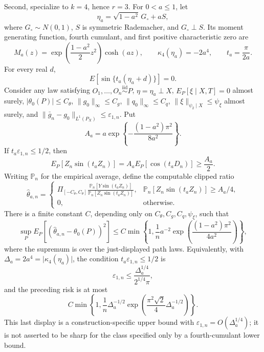 Second, specialize to \(k=4\), hence \(r=3\).  For \(0<a\le1\), let
\[
 \eta_a=\sqrt{1-a^2}\,G_{\circ}+aS,
\]
where \(G_{\circ}\sim N(0,1)\), \(S\) is symmetric Rademacher, and \(G_{\circ}\perp S\).  Its moment generating function, fourth cumulant, and first positive characteristic zero are
\[
 M_a(z)=\exp\!\left(\frac{1-a^2}{2}z^2\right)\cosh(az),
 \qquad
 \kappa_4(\eta_a)=-2a^4,
 \qquad
 t_a=\frac{\pi}{2a}.
\]
For every real \(d\),
\[
 E\!\left[\sin\{t_a(\eta_a+d)\}\right]=0.
\]
Consider any law satisfying \(O_1,\ldots,O_n\stackrel{\mathrm{iid}}{\sim}P\), \(\eta=\eta_a\perp X\), \(E_P[\xi\mid X,T]=0\) almost surely, \(\lvert\theta_0(P)\rvert\le C_{\theta}\), \(\lVert g_0\rVert_{\infty}\le C_g\), \(\lVert q_0\rVert_{\infty}\le C_q\), \(\lVert\xi\rVert_{\psi_2\mid X}\le\psi_{\xi}\) almost surely, and \(\lVert\bar g_n-g_0\rVert_{L^1(P_X)}\le\varepsilon_{1,n}\).  Put
\[
 A_a=a\exp\!\left\{-\frac{(1-a^2)\pi^2}{8a^2}\right\}.
\]
If \(t_a\varepsilon_{1,n}\le1/2\), then
\[
 E_P\!\left[Z_n\sin(t_aZ_n)\right]
 =A_aE_P[\cos(t_aD_n)]
 \ge\frac{A_a}{2}.
\]
Writing \(\mathbb P_n\) for the empirical average, define the computable clipped ratio
\[
 \widehat\theta_{a,n}
 =
 \begin{cases}
 \displaystyle
 \Pi_{[-C_{\theta},C_{\theta}]}
 \frac{\mathbb P_n[Y\sin(t_aZ_n)]}
      {\mathbb P_n[Z_n\sin(t_aZ_n)]},
 &\displaystyle
 \mathbb P_n[Z_n\sin(t_aZ_n)]\ge A_a/4,\\[3mm]
 0,&\text{otherwise}.
 \end{cases}
\]
There is a finite constant \(C\), depending only on \(C_{\theta},C_g,C_q,\psi_{\xi}\), such that
\[
 \sup_P E_P\!\left[(\widehat\theta_{a,n}-\theta_0(P))^2\right]
 \le
 C\min\!\left\{
  1,\frac{1}{n}a^{-2}
  \exp\!\left(\frac{(1-a^2)\pi^2}{4a^2}\right)
 \right\},
\]
where the supremum is over the just-displayed path laws.  Equivalently, with \(\Delta_a=2a^4=\lvert\kappa_4(\eta_a)\rvert\), the condition \(t_a\varepsilon_{1,n}\le1/2\) is
\[
 \varepsilon_{1,n}\le\frac{\Delta_a^{1/4}}{2^{1/4}\pi},
\]
and the preceding risk is at most
\[
 C\min\!\left\{
  1,\frac{1}{n}\Delta_a^{-1/2}
  \exp\!\left(\frac{\pi^2\sqrt2}{4}\Delta_a^{-1/2}\right)
 \right\}.
\]
This last display is a construction-specific upper bound with \(\varepsilon_{1,n}=O(\Delta_a^{1/4})\); it is not asserted to be sharp for the class specified only by a fourth-cumulant lower bound.